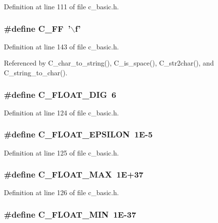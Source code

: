Definition at line 111 of file c\_\-basic.h.
\subsubsection{\setlength{\rightskip}{0pt plus 5cm}\#define C\_\-FF~'$\backslash$f'}\label{c__basic_8h_7134d5a2186866e9ff43e87560a99612}




Definition at line 143 of file c\_\-basic.h.

Referenced by C\_\-char\_\-to\_\-string(), C\_\-is\_\-space(), C\_\-str2char(), and C\_\-string\_\-to\_\-char().
\subsubsection{\setlength{\rightskip}{0pt plus 5cm}\#define C\_\-FLOAT\_\-DIG~6}\label{c__basic_8h_3f2e3ded1c2926f93305b9afec1b5bb3}




Definition at line 124 of file c\_\-basic.h.
\subsubsection{\setlength{\rightskip}{0pt plus 5cm}\#define C\_\-FLOAT\_\-EPSILON~1E-5}\label{c__basic_8h_c5510d31bdf33a446816ff1831709ced}




Definition at line 125 of file c\_\-basic.h.
\subsubsection{\setlength{\rightskip}{0pt plus 5cm}\#define C\_\-FLOAT\_\-MAX~1E+37}\label{c__basic_8h_285b184112b389d72422212b20c1f444}




Definition at line 126 of file c\_\-basic.h.
\subsubsection{\setlength{\rightskip}{0pt plus 5cm}\#define C\_\-FLOAT\_\-MIN~1E-37}\label{c__basic_8h_39047432edb7ef6ead4052b2d79bd5e8}




